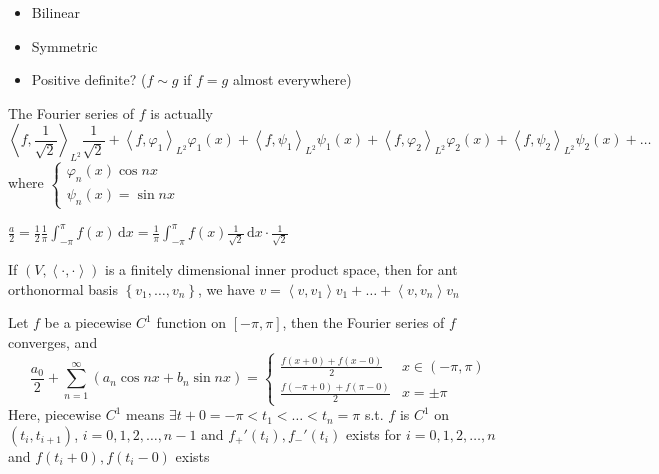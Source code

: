 \begin{itemize}
    \item Bilinear
    \item Symmetric
    \item Positive definite? ($f\sim g$ if $f=g$ almost everywhere)
\end{itemize}


The Fourier series of $f$ is actually
$$\left<f,\frac{1}{\sqrt{2}}\right>_{L^2}\frac{1}{\sqrt{2}}+\left<f,\varphi_1\right>_{L^2}\varphi_1(x)+\left<f,\psi_1\right>_{L^2}\psi_1(x)+\left<f,\varphi_2\right>_{L^2}\varphi_2(x)+\left<f,\psi_2\right>_{L^2}\psi_2(x)+\dots$$
where $\begin{cases}
        \varphi_n(x)\cos nx \\
        \psi_n(x)=\sin nx
    \end{cases}$

$\frac{a}{2}=\frac{1}{2}\frac{1}{\pi}\int_{-\pi}^{\pi}f(x)\,\mathrm{d}x=\frac{1}{\pi}\int_{-\pi}^{\pi}f(x)\frac{1}{\sqrt{2}}\,\mathrm{d}x\cdot\frac{1}{\sqrt{2}}$

\begin{remark}
    If $\left(V,\left<\cdot,\cdot\right>\right)$ is a finitely dimensional inner product space, then for ant orthonormal basis $\left\{v_1,\dots,v_n\right\}$, we have $v=\left<v,v_1\right>v_1+\dots+\left<v,v_n\right>v_n$
\end{remark}

\begin{theorem}
    Let $f$ be a piecewise $C^1$ function on $[-\pi,\pi]$, then the Fourier series of $f$ converges, and
    $$\frac{a_0}{2}+\sum_{n=1}^{\infty}\left(a_n\cos nx+b_n\sin nx\right)=\begin{cases}
            \frac{f(x+0)+f(x-0)}{2}      & x\in(-\pi,\pi) \\
            \frac{f(-\pi+0)+f(\pi-0)}{2} & x=\pm\pi
        \end{cases}$$
    Here, piecewise $C^1$ means $\exists t+0=-\pi<t_1<\dots<t_n=\pi$ s.t. $f$ is $C^1$ on $(t_i,t_{i+1})$, $i=0,1,2,\dots,n-1$ and $f_+'(t_i),f_-'(t_i)$ exists for $i=0,1,2,\dots,n$ and $f(t_i+0),f(t_i-0)$ exists
\end{theorem}

